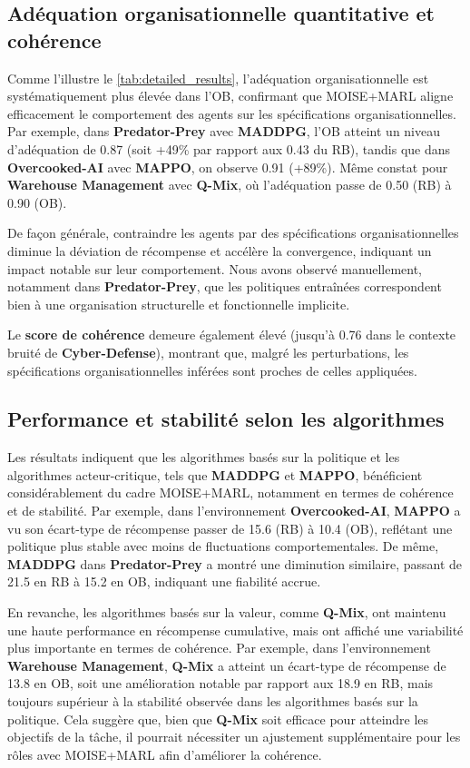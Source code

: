 \documentclass[francais,ROIA,Unicode,manuscript]{cedram}
\begin{document}
\subsection{Adéquation organisationnelle quantitative et cohérence}

\noindent
Comme l'illustre le \autoref{tab:detailed_results}, l'adéquation organisationnelle est systématiquement plus élevée dans l'OB, confirmant que MOISE+MARL aligne efficacement le comportement des agents sur les spécifications organisationnelles.
Par exemple, dans \textbf{Predator-Prey} avec \textbf{MADDPG}, l'OB atteint un niveau d'adéquation de 0.87 (soit +49\% par rapport aux 0.43 du RB), tandis que dans \textbf{Overcooked-AI} avec \textbf{MAPPO}, on observe 0.91 (+89\%). Même constat pour \textbf{Warehouse Management} avec \textbf{Q-Mix}, où l'adéquation passe de 0.50 (RB) à 0.90 (OB).

\medskip
\noindent
De façon générale, contraindre les agents par des spécifications organisationnelles diminue la déviation de récompense et accélère la convergence, indiquant un impact notable sur leur comportement. Nous avons observé manuellement, notamment dans \textbf{Predator-Prey}, que les politiques entraînées correspondent bien à une organisation structurelle et fonctionnelle implicite.

\medskip
\noindent
Le \textbf{score de cohérence} demeure également élevé (jusqu’à 0.76 dans le contexte bruité de \textbf{Cyber-Defense}), montrant que, malgré les perturbations, les spécifications organisationnelles inférées sont proches de celles appliquées.

\subsection{Performance et stabilité selon les algorithmes}

Les résultats indiquent que les algorithmes basés sur la politique et les algorithmes acteur-critique, tels que \textbf{MADDPG} et \textbf{MAPPO}, bénéficient considérablement du cadre MOISE+MARL, notamment en termes de cohérence et de stabilité. Par exemple, dans l'environnement \textbf{Overcooked-AI}, \textbf{MAPPO} a vu son écart-type de récompense passer de 15.6 (RB) à 10.4 (OB), reflétant une politique plus stable avec moins de fluctuations comportementales. De même, \textbf{MADDPG} dans \textbf{Predator-Prey} a montré une diminution similaire, passant de 21.5 en RB à 15.2 en OB, indiquant une fiabilité accrue.

En revanche, les algorithmes basés sur la valeur, comme \textbf{Q-Mix}, ont maintenu une haute performance en récompense cumulative, mais ont affiché une variabilité plus importante en termes de cohérence. Par exemple, dans l'environnement \textbf{Warehouse Management}, \textbf{Q-Mix} a atteint un écart-type de récompense de 13.8 en OB, soit une amélioration notable par rapport aux 18.9 en RB, mais toujours supérieur à la stabilité observée dans les algorithmes basés sur la politique. Cela suggère que, bien que \textbf{Q-Mix} soit efficace pour atteindre les objectifs de la tâche, il pourrait nécessiter un ajustement supplémentaire pour les rôles avec MOISE+MARL afin d'améliorer la cohérence.
\end{document}
